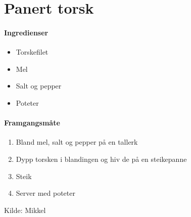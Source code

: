 \section{﻿Panert torsk}


\paragraph{Ingredienser}
\begin{itemize}[noitemsep]
	\item Torskefilet
	\item Mel
	\item Salt og pepper
	\item Poteter
\end{itemize}

\paragraph{Framgangsmåte}
\begin{enumerate}[noitemsep]
	\item Bland mel, salt og pepper på en tallerk
	\item Dypp torsken i blandingen og hiv de på en steikepanne
	\item Steik
	\item Server med poteter
\end{enumerate}


Kilde: Mikkel
